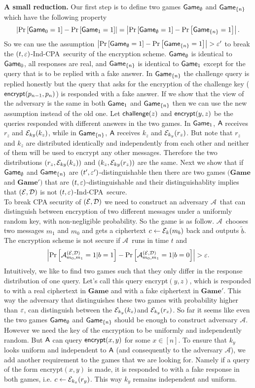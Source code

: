 \documentclass{article}
\newcommand{\tcpa}{$(t,\eps)$-Ind-CPA}
\def\A{{\sf A}}
\def\E{{\cal E}}
\def\D{{\cal D}}
\def\a {${\mathcal A}$}
\newcommand{\encrypt}{{\sf encrypt}}
\newcommand{\game}{{\sf Game}}
\newcommand{\dgame}{{\mathbf{Game}}}
\def\challenge{{\sf challenge}}
\begin{document}
\noindent \textbf{A small reduction.} Our first step is to define two games $\game_{\emptyset}$ and $\game_{\{n\}}$ which have the following property 
\[\abs{\prob{\game_0=1}-\prob{\game_1=1}}=\abs{\prob{\game_{\emptyset}=1}-\prob{\game_{\{n\}}=1}}. \]
\noindent So we can use the assumption $\abs{\prob{\game_{\emptyset}=1}-\prob{\game_{\{n\}}=1}} > \eps'$ to break the \tcpa~security of the encryption scheme. $\game_{\emptyset}$ is identical to $\game_0$, all responses are real, and $\game_{\{n\}}$ is identical to $\game_1$ except for the query that is to be replied with a fake answer. In $\game_{\{n\}}$ the challenge query is replied honestly but the query that asks for the encryption of the challenge key ($\encrypt(p_{n-1},p_{n})$) is responded with a fake answer. If we show that the view of the adversary is the same in both $\game_1$ and $\game_{\{n\}}$ then we can use the new assumption instead of the old one. Let $\challenge(z)$ and $\encrypt(y,z)$ be the queries responded with different answers in the two games.  In $\game_{1}$, $\A$ receives $r_z$ and $\E_{k{y}}(k_z)$, while in $\game_{\cub{n}}$, $\A$ receives $k_z$ and $\E_{k_y}(r_z)$. But note that $r_z$ and $k_z$ are distributed identically and independently from each other and neither of them will be used to encrypt any other messages. Therefore the two distributions $(r_z,\E_{k{y}}(k_z))$ and $(k_z,\E_{k{y}}(r_z))$ are the same. Next we show that if $\game_{\emptyset}$ and $\game_{\cub{n}}$ are $(t',\varepsilon')$-distinguishable then there are two games $(\dgame$ and $\dgame')$ that are $(t,\varepsilon)$-distinguishable and their distinguishablity implies that $(\E,\D)$ is not \tcpa~secure.\\ 

To break CPA security of $(\E,\D)$ we need to construct an adversary \a~that can distinguish between encryption of two different messages under a uniformly random key, with non-negligible probability. So the game is as follow. \a~chooses two messages $m_1$ and $m_0$ and gets a ciphertext $c\leftarrow \E_k(m_b)$ back and outputs $\tilde{b}$. The encryption scheme is not secure if \a~runs in time $t$ and
\[\abs{\prob{{\mathcal A}_{m_0,m_1}^{(\E,\D)}=1|b=1}-\prob{{\mathcal A}_{m_0,m_1}^{(\E,\D)}=1|b=0}}>\eps.\]
Intuitively, we like to find two games such that they only differ in the response distribution of one query. Let's  call this query \encrypt$(y,z)$, which is responded to with a real ciphertext in $\dgame$ and with a fake ciphertext in $\dgame'$. This way the adversary that distinguishes these two games with probability higher than $\varepsilon$, can distinguish between the $\E_{k_y}(k_z)$and $\E_{k_y}(r_z)$. So far it seems like even the two games $\game_{\emptyset}$ and $\game_{\cub{n}}$ should be enough to construct adversary \a. However we need the key of the encryption to be uniformly and independently random. But $\A$ can query $\encrypt(x,y)$ for some $x \in [n]$. To ensure that $k_y$ looks uniform and independent to $\A$ (and consequently to the adversary \a), we add another requirement to the games that we are looking for. Namely if a query of the form \encrypt$(x,y)$ is made, it is responded to with a fake response in both games, i.e. $c \leftarrow \E_{k_x}(r_y)$. This way $k_y$ remains independent and uniform. \\
 
\end{document}

